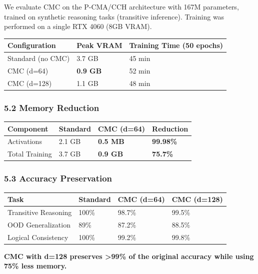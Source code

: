 \documentclass[
  11pt,
  a4paper,
]{article}
\begin{document}
We evaluate CMC on the P-CMA/CCH architecture with 167M parameters,
trained on synthetic reasoning tasks (transitive inference). Training
was performed on a single RTX 4060 (8GB VRAM).

\begin{longtable}[]{@{}lll@{}}
\toprule\noalign{}
Configuration & Peak VRAM & Training Time (50 epochs) \\
\midrule\noalign{}
\endhead
\bottomrule\noalign{}
\endlastfoot
Standard (no CMC) & 3.7 GB & 45 min \\
CMC (d=64) & \textbf{0.9 GB} & 52 min \\
CMC (d=128) & 1.1 GB & 48 min \\
\end{longtable}

\subsubsection{5.2 Memory Reduction}\label{memory-reduction}

\begin{longtable}[]{@{}llll@{}}
\toprule\noalign{}
Component & Standard & CMC (d=64) & Reduction \\
\midrule\noalign{}
\endhead
\bottomrule\noalign{}
\endlastfoot
Activations & 2.1 GB & \textbf{0.5 MB} & \textbf{99.98\%} \\
Total Training & 3.7 GB & \textbf{0.9 GB} & \textbf{75.7\%} \\
\end{longtable}

\subsubsection{5.3 Accuracy Preservation}\label{accuracy-preservation}

\begin{longtable}[]{@{}llll@{}}
\toprule\noalign{}
Task & Standard & CMC (d=64) & CMC (d=128) \\
\midrule\noalign{}
\endhead
\bottomrule\noalign{}
\endlastfoot
Transitive Reasoning & 100\% & 98.7\% & 99.5\% \\
OOD Generalization & 89\% & 87.2\% & 88.5\% \\
Logical Consistency & 100\% & 99.2\% & 99.8\% \\
\end{longtable}

\textbf{CMC with d=128 preserves \textgreater99\% of the original
accuracy while using 75\% less memory.}
\end{document}
